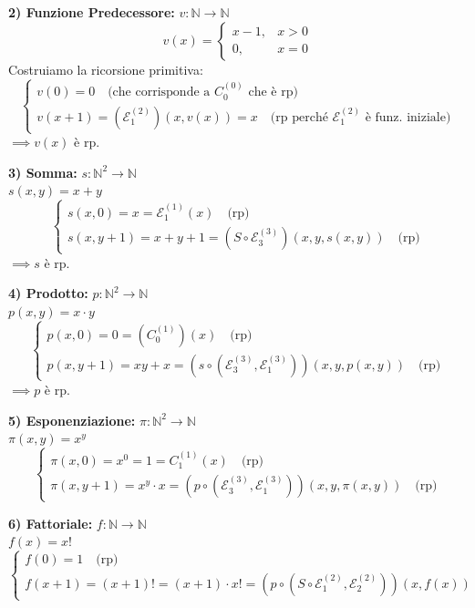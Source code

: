 \vspace{0.4cm}
\textbf{2) Funzione Predecessore:} $v : \mathbb{N} \to \mathbb{N}$
$$
v(x) = \begin{cases} 
x-1, & x > 0 \\ 
0, & x = 0 
\end{cases}
$$
Costruiamo la ricorsione primitiva:
$$
\begin{cases} 
v(0) = 0 \quad \text{(che corrisponde a $C_0^{(0)}$ che è rp)} \\ 
v(x+1) = \left( \mathcal{E}_1^{(2)} \right)(x, v(x)) = x \quad \text{(rp perché $\mathcal{E}_1^{(2)}$ è funz. iniziale)}
\end{cases}
$$
$\implies v(x)$ è rp.

\vspace{0.4cm}
\textbf{3) Somma:} $s : \mathbb{N}^2 \to \mathbb{N}$ \\
$s(x,y) = x+y$
$$
\begin{cases} 
s(x,0) = x = \mathcal{E}_1^{(1)}(x) \quad \text{(rp)} \\ 
s(x, y+1) = x+y+1 = \left( S \circ \mathcal{E}_3^{(3)} \right)(x, y, s(x,y)) \quad \text{(rp)}
\end{cases}
$$
$\implies s$ è rp.

\vspace{0.4cm}
\textbf{4) Prodotto:} $p : \mathbb{N}^2 \to \mathbb{N}$ \\
$p(x,y) = x \cdot y$
$$
\begin{cases} 
p(x,0) = 0 = \left( C_0^{(1)} \right)(x) \quad \text{(rp)} \\ 
p(x, y+1) = xy + x = \left( s \circ (\mathcal{E}_3^{(3)}, \mathcal{E}_1^{(3)}) \right)(x, y, p(x,y)) \quad \text{(rp)}
\end{cases}
$$
$\implies p$ è rp.

\vspace{0.4cm}
\textbf{5) Esponenziazione:} $\pi : \mathbb{N}^2 \to \mathbb{N}$ \\
$\pi(x,y) = x^y$
$$
\begin{cases} 
\pi(x,0) = x^0 = 1 = C_1^{(1)}(x) \quad \text{(rp)} \\ 
\pi(x, y+1) = x^y \cdot x = \left( p \circ (\mathcal{E}_3^{(3)}, \mathcal{E}_1^{(3)}) \right)(x, y, \pi(x,y)) \quad \text{(rp)}
\end{cases}
$$

\vspace{0.4cm}
\textbf{6) Fattoriale:} $f : \mathbb{N} \to \mathbb{N}$ \\
$f(x) = x!$
$$
\begin{cases} 
f(0) = 1 \quad \text{(rp)} \\ 
f(x+1) = (x+1)! = (x+1) \cdot x! = \left( p \circ (S \circ \mathcal{E}_1^{(2)}, \mathcal{E}_2^{(2)}) \right)(x, f(x))
\end{cases}
$$

